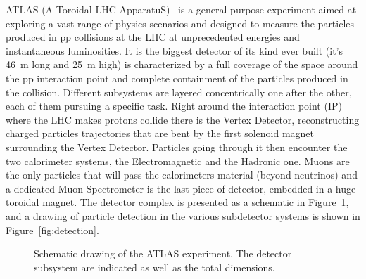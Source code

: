 ATLAS (A Toroidal LHC ApparatuS)~\cite{Aad:2008zzm} is a general purpose experiment
aimed at exploring a vast range of physics scenarios and designed to measure the particles
produced in pp collisions at the LHC at unprecedented energies and instantaneous luminosities. 
It is the biggest detector of its kind ever built (it's 46~m long and 25~m high) is characterized by
a full coverage of the space around the pp interaction point and complete
containment of the particles produced in the collision. Different subsystems are
layered concentrically one after the other, each of them pursuing a specific task. 
Right around the interaction point
(IP) where the LHC makes protons collide there is the Vertex Detector, reconstructing
charged particles trajectories that are bent by the first solenoid magnet surrounding
the Vertex Detector. Particles going through it then encounter the two calorimeter systems,
the Electromagnetic and the Hadronic one. Muons are the only particles that will pass
the calorimeters material (beyond neutrinos) and a dedicated Muon Spectrometer is the last
piece of detector, embedded in a huge toroidal magnet. The detector complex is presented
as a schematic in Figure~\ref{fig:atlas}, and a drawing of particle detection in the various
subdetector systems is shown in Figure~\ref{fig:detection}. 

\begin{figure}[htb]\begin{center}
	\caption{Schematic drawing of the ATLAS experiment. The detector subsystem are indicated as well as the total dimensions.\label{fig:atlas}}
\end{center}\end{figure}

